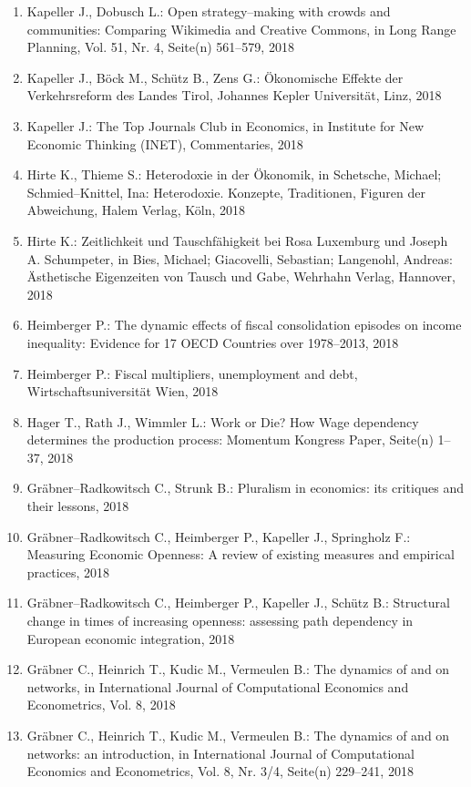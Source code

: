 \begin{enumerate}
	 \item Kapeller J., Dobusch L.: Open strategy--making with crowds and communities: Comparing Wikimedia and Creative Commons, in Long Range Planning, Vol. 51, Nr. 4, Seite(n) 561--579, 2018
	 \item Kapeller J., Böck M., Schütz B., Zens G.: Ökonomische Effekte der Verkehrsreform des Landes Tirol, Johannes Kepler Universität, Linz, 2018
	 \item Kapeller J.: The Top Journals Club in Economics, in Institute for New Economic Thinking (INET), Commentaries, 2018
	 \item Hirte K., Thieme S.: Heterodoxie in der Ökonomik, in Schetsche, Michael; Schmied--Knittel, Ina: Heterodoxie. Konzepte, Traditionen, Figuren der Abweichung, Halem Verlag, Köln, 2018
	 \item Hirte K.: Zeitlichkeit und Tauschfähigkeit bei Rosa Luxemburg und Joseph A. Schumpeter, in Bies, Michael; Giacovelli, Sebastian; Langenohl, Andreas: Ästhetische Eigenzeiten von Tausch und Gabe, Wehrhahn Verlag, Hannover, 2018
	 \item Heimberger P.: The dynamic effects of fiscal consolidation episodes on income inequality: Evidence for 17 OECD Countries over 1978--2013, 2018
	 \item Heimberger P.: Fiscal multipliers, unemployment and debt, Wirtschaftsuniversität Wien, 2018
	 \item Hager T., Rath J., Wimmler L.: Work or Die? How Wage dependency determines the production process: Momentum Kongress Paper, Seite(n) 1--37, 2018
	 \item Gräbner--Radkowitsch C., Strunk B.: Pluralism in economics: its critiques and their lessons, 2018
	 \item Gräbner--Radkowitsch C., Heimberger P., Kapeller J., Springholz F.: Measuring Economic Openness: A review of existing measures and empirical practices, 2018
	 \item Gräbner--Radkowitsch C., Heimberger P., Kapeller J., Schütz B.: Structural change in times of increasing openness: assessing path dependency in European economic integration, 2018
	 \item Gräbner C., Heinrich T., Kudic M., Vermeulen B.: The dynamics of and on networks, in International Journal of Computational Economics and Econometrics, Vol. 8, 2018
	 \item Gräbner C., Heinrich T., Kudic M., Vermeulen B.: The dynamics of and on networks: an introduction, in International Journal of Computational Economics and Econometrics, Vol. 8, Nr. 3/4, Seite(n) 229--241, 2018

\end{enumerate}
